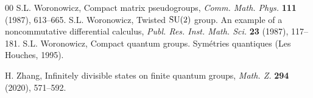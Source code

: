 \documentclass[reqno]{amsart}
\numberwithin{equation}{section}
\begin{document}
\begin{thebibliography}{00}
 S.L. Woronowicz, Compact matrix pseudogroups, \textit{Comm. Math. Phys.} \textbf{111} (1987), 613--665.
 S.L. Woronowicz, Twisted {${\rm SU}(2)$} group. {A}n example of a noncommutative differential calculus, \textit{Publ. Res. Inst. Math. Sci.} \textbf{23} (1987), 117--181.
 S.L. Woronowicz, Compact quantum groups. Symétries quantiques (Les Houches, 1995).

 H. Zhang, Infinitely divisible states on finite quantum groups, \emph{Math. Z.} \textbf{294} (2020), 571--592.
\end{thebibliography}
\end{document}
